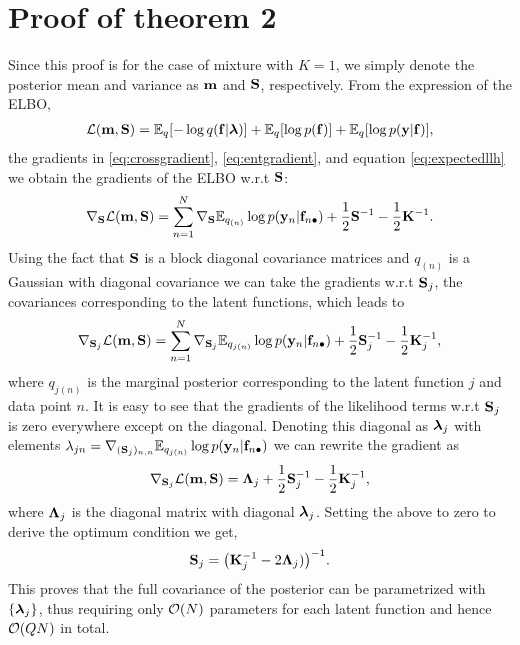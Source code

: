 \documentclass{article} %
\begin{document}
\section{Proof of theorem 2}
Since this proof is for the case of mixture with $K = 1$, we simply denote the posterior mean and variance as $\m$ and $\S$, respectively.
From the expression of the ELBO,
\newcommand{\ELBO}{\calL(\m, \S)}
\begin{align}
\ELBO
 = \expectation_q [ - \log q(\f | \llambda)] 
+ \expectation_q  [\log p(\f)]
+ \expectation_q  [\log p(\y | \f)],
\end{align}
the gradients in \eqref{eq:crossgradient}, \eqref{eq:entgradient}, and equation \eqref{eq:expectedllh} we obtain the gradients of the ELBO w.r.t $\S$:
\begin{align}
\nabla_{\S} \ELBO =
 \sum_{n=1}^N \nabla_{\S} \expectation_{q_{(n)}} \log p(\y_n | \fn)
 + \frac{1}{2} \S^{-1}  - \frac{1}{2} \K^{-1}.
\end{align}
Using the fact that $\S$ is a block diagonal covariance matrices and $q_{(n)}$ is a Gaussian with diagonal covariance we can take the gradients w.r.t $\S_j$, the covariances corresponding to the latent functions, which leads to
\begin{align}
\nabla_{\S_j} \ELBO =
 \sum_{n=1}^N \nabla_{\S_j} \expectation_{q_{j(n)}} \log p(\y_n | \fn)
 + \frac{1}{2} \S_j^{-1}  - \frac{1}{2} \K_j^{-1},
\end{align}
where $q_{j(n)}$ is the marginal posterior corresponding to the latent function $j$ and data point $n$.
It is easy to see that the gradients of the likelihood terms w.r.t $\S_j$ is zero everywhere except on the diagonal.
Denoting this diagonal as $\llambda_{j}$ with elements $\lambda_{jn} = \nabla_{(\S_j)_{n,n}} \expectation_{q_{j(n)}} \log p(\y_n | \fn)$ we can rewrite the gradient as
\begin{align}
\nabla_{\S_j} \ELBO =  \mat{\Lambda}_{j} + \frac{1}{2} \S_j^{-1}  - \frac{1}{2} \K_j^{-1},
\end{align}
where $\mat{\Lambda}_{j}$ is the diagonal matrix with diagonal $\llambda_{j}$.
Setting the above to zero to derive the optimum condition we get,
\begin{align}
\S_j = \big( \K_j^{-1} - 2\mat{\Lambda}_{j}) \big)^{-1}.
\end{align}
This proves that the full covariance of the posterior can be parametrized with  $\{\llambda_{j}\}$, thus requiring only $\calO(N)$ parameters for each latent function and hence $\calO(QN)$ in total.
\end{document}
